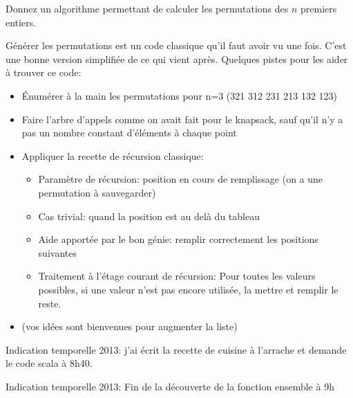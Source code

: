\documentclass[10pt]{article}\usepackage[correction,nu]{esial}
\begin{document}
\begin{Question}
  Donnez un algorithme permettant de calculer les permutations des $n$ premiers
  entiers.
\end{Question}
\begin{Reponse}
  Générer les permutations est un code classique qu'il faut avoir vu une
  fois. C'est une bonne version simplifiée de ce qui vient après.  Quelques
  pistes pour les aider à trouver ce code:
  \begin{itemize}
  \item Énumérer à la main les permutations pour n=3 (321 312 231 213 132 123)
  \item Faire l'arbre d'appels comme on avait fait pour le knapsack, sauf qu'il
    n'y a pas un nombre constant d'éléments à chaque point
  \item Appliquer la recette de récursion classique:
    \begin{itemize}
    \item Paramètre de récursion: position en cours de remplissage (on a une
      permutation à sauvegarder)
    \item Cas trivial: quand la position est au delà du tableau
    \item Aide apportée par le bon génie: remplir correctement les positions suivantes
    \item Traitement à l'étage courant de récursion: Pour toutes les valeurs
      possibles, si une valeur n'est pas encore utilisée, la mettre et remplir
      le reste.
    \end{itemize}
  \item (vos idées sont bienvenues pour augmenter la liste)
  \end{itemize}

  Indication temporelle 2013: j'ai écrit la recette de cuisine à l'arrache et
  demande le code scala à 8h40.
 
  \newcommand*\FancyVerbStopString{// Fin génération, début du test}

  Indication temporelle 2013: Fin de la découverte de la fonction ensemble à 9h
\end{Reponse}
\end{document}
